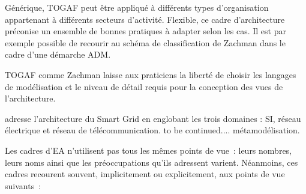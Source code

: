 Générique, TOGAF peut être appliqué à différents types d'organisation
appartenant à différents secteurs d'activité. Flexible, ce cadre d'architecture
préconise un ensemble de bonnes pratiques à adapter selon les cas. Il est par
exemple possible de recourir au schéma de classification de Zachman dans le
cadre d'une démarche ADM.

TOGAF comme Zachman laisse aux praticiens la liberté de choisir les langages de
modélisation et le niveau de détail requis pour la conception des vues de
l'architecture. 

%
adresse l'architecture du Smart Grid en englobant les trois domaines : SI, 
réseau électrique et réseau de télécommunication. to be continued....
%
%
%
%
%
%
métamodélisation. 


Les cadres d'EA n'utilisent pas tous les mêmes points de vue~: leurs nombres,
leurs noms ainsi que les préoccupations qu'ils adressent varient. Néanmoins,
ces cadres recourent souvent, implicitement ou explicitement, aux points de vue
suivants~:

